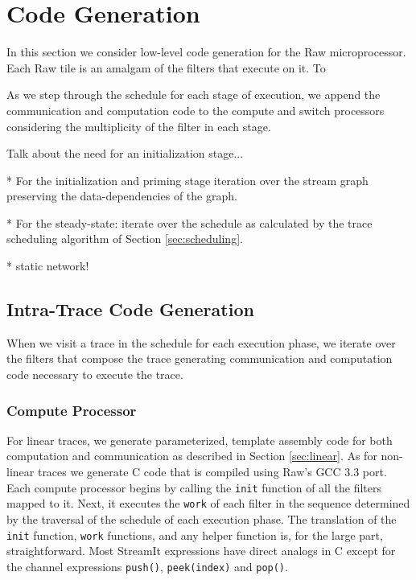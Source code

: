 \section{Code Generation}
\label{sec:codegen}
In this section we consider low-level code generation for the Raw
microprocessor. Each Raw tile is an amalgam of the filters that
execute on it. To 

As we step through the schedule for each stage of
execution, we append the communication and computation code to the
compute and switch processors considering the multiplicity of the
filter in each stage.

Talk about the need for an initialization stage...

* For the initialization and priming stage iteration over the stream
graph preserving the data-dependencies of the graph.

* For the steady-state: iterate over the schedule as calculated by the trace scheduling
algorithm of Section \ref{sec:scheduling}.

* static network!

\subsection{Intra-Trace Code Generation}
When we visit a trace in the schedule for each execution phase, we
iterate over the filters that compose the trace generating 
communication and computation code necessary to execute the trace.

\subsubsection{Compute Processor}
For linear traces, we generate parameterized, template assembly code
for both computation and communication as described in Section
\ref{sec:linear}.  As for non-linear traces we generate C code that is
compiled using Raw's GCC 3.3 port.  Each compute processor begins by
calling the {\tt init} function of all the filters mapped to it.
Next, it executes the {\tt work} of each filter in the sequence
determined by the traversal of the schedule of each execution phase.
The translation of the {\tt init} function, {\tt work} functions, and
any helper function is, for the large part, straightforward.  Most
StreamIt expressions have direct analogs in C except for the channel
expressions {\tt push()}, {\tt peek(index)} and {\tt pop()}.

